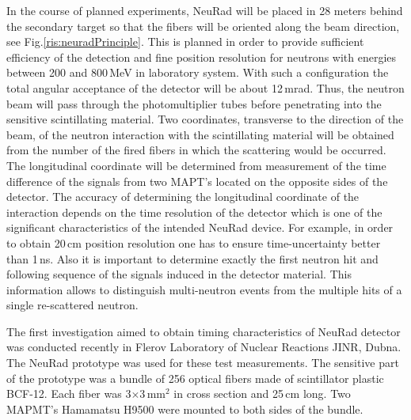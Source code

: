 \documentclass{webofc}
\begin{document}
In the course of planned experiments, NeuRad will be placed in 28 meters behind the secondary target so that the fibers will be oriented along the beam direction, see Fig.\ref{ris:neuradPrinciple}.
This is planned in order to provide sufficient efficiency of the detection and fine position resolution for neutrons with energies between 200 and 800\,MeV in laboratory system.
With such a configuration the total angular acceptance of the detector will be about 12\,mrad.
Thus, the neutron beam will pass through the photomultiplier tubes before penetrating into the sensitive scintillating material.
Two coordinates, transverse to the direction of the beam, of the neutron interaction with the scintillating material will be obtained from the number of the fired fibers in which the scattering would be occurred.
The longitudinal coordinate will be determined from measurement of the time difference of the signals from two MAPT's located on the opposite sides of the detector.
The accuracy of determining the longitudinal coordinate of the interaction depends on the time resolution of the detector which is one of the significant characteristics of the intended NeuRad device.
For example, in order to obtain 20\,cm position resolution one has to ensure time-uncertainty better than 1\,ns.
Also it is important to determine exactly the first neutron hit and following sequence of the signals induced in the detector material. This information allows to distinguish multi-neutron events from the multiple hits of a single re-scattered neutron.


The first investigation aimed to obtain timing characteristics of NeuRad detector was conducted recently in Flerov Laboratory of Nuclear Reactions JINR, Dubna. The NeuRad prototype was used for these test measurements. The sensitive part of the prototype was a bundle of 256 optical fibers made of scintillator plastic BCF-12. Each fiber was  3$\times$3\,mm$^2$ in cross section and 25\,cm long.
Two MAPMT's Hamamatsu H9500 were mounted to both sides of the bundle.
\end{document}
